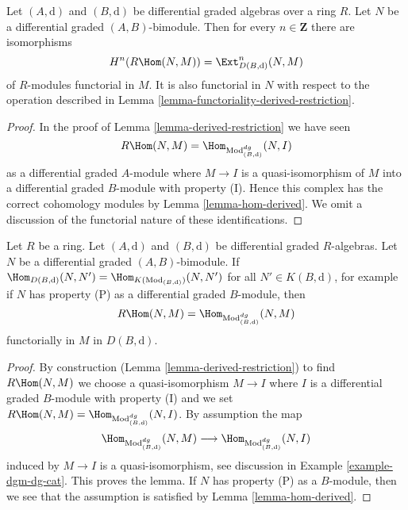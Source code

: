 \begin{lemma}
\label{lemma-derived-restriction-exts}
Let $(A, \text{d})$ and $(B, \text{d})$ be differential graded algebras
over a ring $R$. Let $N$ be a differential graded $(A, B)$-bimodule.
Then for every $n \in \mathbf{Z}$ there are isomorphisms
$$
H^n(R\Hom(N, M)) = \Ext^n_{D(B, \text{d})}(N, M)
$$
of $R$-modules functorial in $M$. It is also functorial in $N$
with respect to the operation described in
Lemma \ref{lemma-functoriality-derived-restriction}.
\end{lemma}

\begin{proof}
In the proof of Lemma \ref{lemma-derived-restriction}
we have seen
$$
R\Hom(N, M) = 
\Hom_{\text{Mod}^{dg}_{(B, \text{d})}}(N, I)
$$
as a differential graded $A$-module
where $M \to I$ is a quasi-isomorphism of $M$ into a differential
graded $B$-module with property (I). Hence this complex has the
correct cohomology modules by Lemma \ref{lemma-hom-derived}.
We omit a discussion of the functorial nature of these
identifications.
\end{proof}

\begin{lemma}
\label{lemma-compute-derived-restriction}
Let $R$ be a ring. Let $(A, \text{d})$ and $(B, \text{d})$ be
differential graded $R$-algebras. Let $N$ be a differential
graded $(A, B)$-bimodule. If
$\Hom_{D(B, \text{d})}(N, N') = \Hom_{K(\text{Mod}_{(B, \text{d})})}(N, N')$
for all $N' \in K(B, \text{d})$, for example if $N$
has property (P) as a differential graded $B$-module, then
$$
R\Hom(N, M) = \Hom_{\text{Mod}^{dg}_{(B, \text{d})}}(N, M)
$$
functorially in $M$ in $D(B, \text{d})$.
\end{lemma}

\begin{proof}
By construction (Lemma \ref{lemma-derived-restriction})
to find $R\Hom(N, M)$ we choose a quasi-isomorphism
$M \to I$ where $I$ is a differential graded $B$-module
with property (I) and we set
$R\Hom(N, M) = \Hom_{\text{Mod}^{dg}_{(B, \text{d})}}(N, I)$.
By assumption the map
$$
\Hom_{\text{Mod}^{dg}_{(B, \text{d})}}(N, M) \longrightarrow
\Hom_{\text{Mod}^{dg}_{(B, \text{d})}}(N, I)
$$
induced by $M \to I$ is a quasi-isomorphism, see discussion in
Example \ref{example-dgm-dg-cat}. This proves the lemma.
If $N$ has property (P) as a $B$-module, then we see that the
assumption is satisfied by Lemma \ref{lemma-hom-derived}.
\end{proof}




